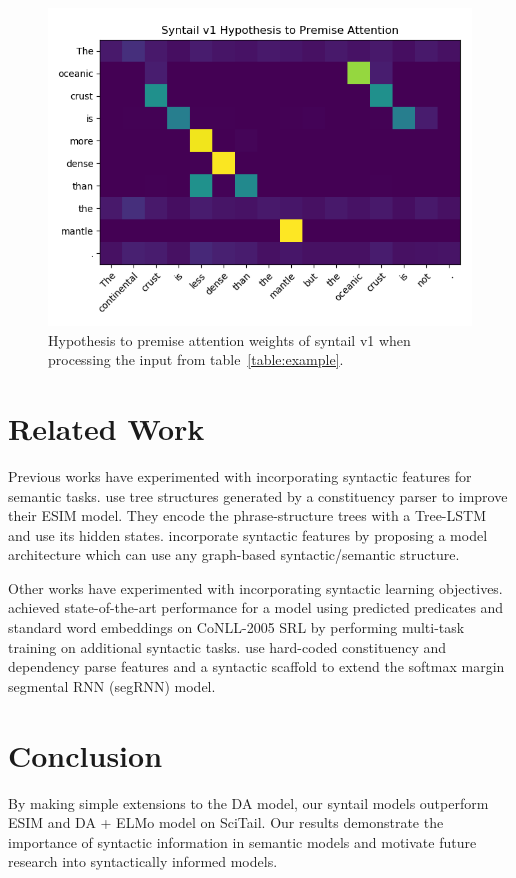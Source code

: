 \documentclass[11pt,a4paper]{article}
\begin{document}
\begin{figure}[h]
    \centering
    \includegraphics[width=\linewidth]{figures/syntail-h2p-attention.png}
    \caption{Hypothesis to premise attention weights of syntail v1 when processing
             the input from table~\ref{table:example}.}
    \label{fig:sytail-attention-weights}
\end{figure}

\section{Related Work}

Previous works have experimented with incorporating syntactic features for semantic tasks.
\citet{Chen2016-wl} use tree structures generated by a constituency parser to improve
their ESIM model. They encode the phrase-structure trees with a Tree-LSTM and use its
hidden states. \citet{Khot2018-th} incorporate syntactic features by
proposing a model architecture which can use any graph-based syntactic/semantic structure.

Other works have experimented with incorporating syntactic learning objectives.
\citet{Strubell2018-qw} achieved state-of-the-art performance
for a model using predicted predicates and standard word embeddings on
CoNLL-2005 SRL by performing multi-task training on additional syntactic tasks.
\citet{Swayamdipta2017-ct} use hard-coded constituency and dependency parse features
and a syntactic scaffold to
extend the softmax margin segmental RNN (segRNN) model.

\section{Conclusion}

By making simple extensions to the DA model,
our syntail models outperform ESIM and DA + ELMo model on SciTail.
Our results demonstrate the importance of syntactic information in semantic models
and motivate future research into syntactically informed models.



\end{document}
